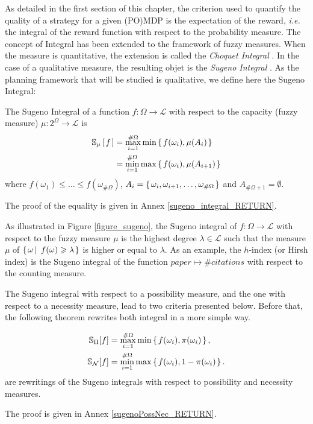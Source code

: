 As detailed in the first section of this chapter,
the criterion used to quantify the quality of a strategy
for a given (PO)MDP
is the expectation of the reward, \textit{i.e.}
the integral of the reward function 
with respect to the probability measure.
The concept of Integral has been extended to
the framework of fuzzy measures.
When the measure is quantitative, the extension is called the \textit{Choquet Integral} \cite{Choquet1954}.
In the case of a qualitative measure, the resulting objet is the \textit{Sugeno Integral} \cite{Sugeno74}.
As the planning framework that will be studied is qualitative,
we define here the Sugeno Integral:
\begin{Def}
\label{sugeno_integral}
The Sugeno Integral of a function 
$f:\Omega \rightarrow \mathcal{L}$ with respect to the capacity (fuzzy measure) $\mu:2^{\Omega} \rightarrow \mathcal{L}$ is 
\begin{align} 
\label{equation_sugeno1} \mathbb{S}_{\mu} \left[ \left.  f  \right. \right] &= \max_{i=1}^{\# \Omega} \min \left\{ \left.  f(\omega_i), \mu(A_i)  \right. \right\} \\
\label{equation_sugeno2} &=  \min_{i=1}^{\# \Omega} \max \left\{ \left.  f(\omega_i), \mu(A_{i+1})  \right. \right\}
\end{align}
where $f(\omega_1) \leqslant \ldots \leqslant f(\omega_{\# \Omega})$, 
 $A_i = \left\{ \left.  \omega_i, \omega_{i+1}, \ldots, \omega_{\# \Omega}  \right. \right\}$
and $A_{\#\Omega+1} = \emptyset$.
\end{Def}
The proof of the equality is given in Annex \ref{sugeno_integral_RETURN}.

As illustrated in Figure \ref{figure_sugeno}, the Sugeno integral of $f: \Omega \rightarrow \mathcal{L}$ with respect to the fuzzy measure $\mu$
is the highest degree $\lambda \in \mathcal{L}$ 
such that the measure $\mu$ of $\left\{ \left.  \omega \, \right| \left. \, f(\omega) \geqslant \lambda \right. \right\}$ 
is higher or equal to $\lambda$. As an example, the $h$-index
(or Hirsh index) is the Sugeno integral of the function $paper \mapsto \# citations$ 
with respect to the counting measure.

The Sugeno integral with respect to a possibility measure,
and the one with respect to a necessity measure,
lead to two criteria presented below. %
Before that, the following theorem rewrites both integral in a more simple way.
\begin{theorem}
\label{sugenoPossNec}
\begin{align}
\label{equation_sugenoposs} \mathbb{S}_{\Pi}[f] &= \max_{i=1}^{\# \Omega} \min \left\{ \left.  f(\omega_i), \pi(\omega_i)  \right. \right\},\\
\label{equation_sugenonec} \mathbb{S}_{\mathcal{N}}[f] &= \min_{i=1}^{\# \Omega} \max \left\{ \left.  f(\omega_i), 1-\pi(\omega_i)  \right. \right\} .
\end{align}
are rewritings of the Sugeno integrals with respect to 
possibility and necessity measures.
\end{theorem}
The proof is given in Annex \ref{sugenoPossNec_RETURN}.

